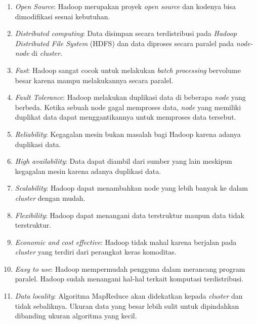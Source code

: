 \begin{enumerate}

\item {\it Open Source}: Hadoop merupakan proyek {\it open source} dan kodenya bisa dimodifikasi sesuai kebutuhan. 

\item {\it Distributed computing}: Data disimpan secara terdistribusi pada \textit{Hadoop Distributed File System} (HDFS) dan data diproses secara paralel pada \textit{node-node} di {\it cluster}.

\item {\it Fast}: Hadoop sangat cocok untuk melakukan {\it batch processing} bervolume besar karena mampu melakukannya secara paralel.

\item {\it Fault Tolerance}: Hadoop melakukan duplikasi data di beberapa \textit{node} yang berbeda. Ketika sebuah node gagal memproses data, \textit{node} yang memiliki duplikat data dapat menggantikannya untuk memproses data tersebut.

\item {\it Reliability}: Kegagalan mesin bukan masalah bagi Hadoop karena adanya duplikasi data.


\item {\it High availability}: Data dapat diambil dari sumber yang lain meskipun kegagalan mesin karena adanya duplikasi data.

\item {\it Scalability}: Hadoop dapat menambahkan node yang lebih banyak ke dalam {\it cluster} dengan mudah.

\item {\it Flexibility}: Hadoop dapat menangani data terstruktur maupun data tidak terstruktur. 

\item {\it Economic and cost effective}: Hadoop tidak mahal karena berjalan pada {\it cluster} yang terdiri dari perangkat keras komoditas.

\item {\it Easy to use}: Hadoop mempermudah pengguna dalam merancang program paralel. Hadoop sudah menangani hal-hal terkait komputasi terdistribusi.

\item {\it Data locality}: Algoritma MapReduce akan didekatkan kepada {\it cluster} dan tidak sebaliknya. Ukuran data yang besar lebih sulit untuk dipindahkan dibanding ukuran algoritma yang kecil.


\end{enumerate}


